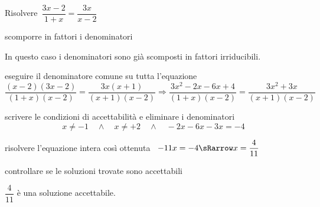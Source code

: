  \begin{esempio}
Risolvere~$\dfrac{3x-2}{1+x}=\dfrac{3x}{x-2}$
 
\begin{enumerate*}
\item scomporre in fattori i denominatori

In questo caso i denominatori sono già scomposti in fattori irriducibili.

\item eseguire il denominatore comune su tutta l'equazione
\[\frac{(x-2)(3x-2)}{(1+x)(x-2)}=\frac{3x(x+1)}{(x+1)(x-2)}\Rightarrow
\frac{3x^{2}-2x-6x+4}{(1+x)(x-2)}=\frac{3x^2+3x}{(x+1)(x-2)}\]

\item scrivere le condizioni di accettabilità e eliminare i denominatori
\[x \neq -1 \quad \wedge \quad x \neq +2 \quad \wedge \quad 
-2x -6x -3x = -4\]
\item risolvere l'equazione intera così ottenuta~
\(-11x = -4 \sRarrow x=\dfrac{4}{11}\)

\item controllare se le soluzioni trovate sono accettabili

\centering $\dfrac{4}{11}$ è una soluzione accettabile.

\end{enumerate*}
 \end{esempio}

